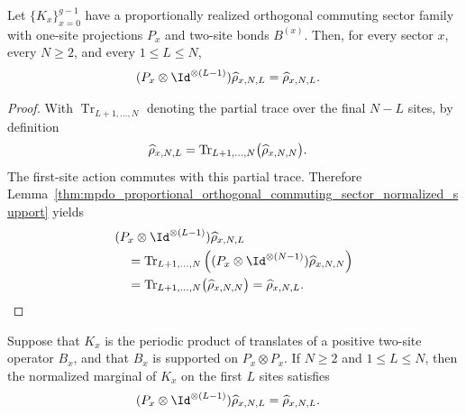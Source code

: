 \begin{lemma}
    \label{thm:mpdo_proportional_orthogonal_commuting_sector_marginal_support}
    \leanok
    Let $\{K_x\}_{x=0}^{g-1}$ have a proportionally realized orthogonal
    commuting sector family with one-site projections $P_x$ and two-site
    bonds $B^{(x)}$. Then, for every sector $x$, every $N\geq2$, and every
    $1\leq L\leq N$,
    \begin{align}
        (P_x\otimes\Id^{\otimes(L-1)})\widehat\rho_{x,N,L}
         & =\widehat\rho_{x,N,L}.
        \notag
    \end{align}
\end{lemma}

\begin{proof}\leanok
    With $\operatorname{Tr}_{L+1,\ldots,N}$ denoting the partial trace over
    the final $N-L$ sites, by definition
    \begin{align}
        \widehat\rho_{x,N,L}
         & =\operatorname{Tr}_{L+1,\ldots,N}
        \bigl(\widehat\rho_{x,N,N}\bigr).
        \notag
    \end{align}
    The first-site action commutes with this partial trace. Therefore
    Lemma~\ref{thm:mpdo_proportional_orthogonal_commuting_sector_normalized_support}
    yields
    \begin{align}
         & (P_x\otimes\Id^{\otimes(L-1)})\widehat\rho_{x,N,L}
        \notag                                                \\
         & \quad=
        \operatorname{Tr}_{L+1,\ldots,N}
        \left(
        (P_x\otimes\Id^{\otimes(N-1)})
        \widehat\rho_{x,N,N}
        \right)
        \notag                                                \\
         & \quad=
        \operatorname{Tr}_{L+1,\ldots,N}
        \bigl(\widehat\rho_{x,N,N}\bigr)
        =\widehat\rho_{x,N,L}.
        \notag
    \end{align}
\end{proof}

\begin{lemma}
    \label{lem:mpdo_orthogonal_commuting_sector_marginal_support}
    \leanok
    Suppose that $K_x$ is the periodic product of translates of a positive
    two-site operator $B_x$, and that $B_x$ is supported on
    $P_x\otimes P_x$. If $N\geq2$ and $1\leq L\leq N$, then the normalized
    marginal of $K_x$ on the first $L$ sites satisfies
    \begin{align}
        (P_x\otimes\Id^{\otimes(L-1)})
        \widehat\rho_{x,N,L}
         & =\widehat\rho_{x,N,L}.
        \notag
    \end{align}
\end{lemma}


